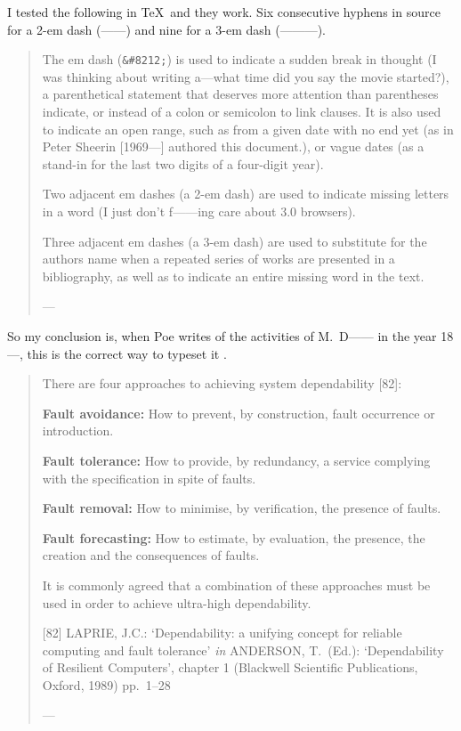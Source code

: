 \documentclass[a4paper]{article}
\begin{document}
\medskip
I tested the following in \TeX\ and they work.  Six consecutive hyphens
in source for a 2-em dash (------) and nine for a 3-em dash (---------).

\begin{quote}
	The em dash (\verb,&#8212;,) is used to indicate a sudden break
	in thought (I was thinking about writing a---what time did you
	say the movie started?), a parenthetical statement that deserves
	more attention than parentheses indicate, or instead of a colon
	or semicolon to link clauses.  It is also used to indicate an
	open range, such as from a given date with no end yet (as in Peter
	Sheerin [1969---] authored this document.), or vague dates (as
	a stand-in for the last two digits of a four-digit year).

	Two adjacent em dashes (a 2-em dash) are used to indicate missing
	letters in a word (I just don't f------ing care about 3.0 browsers).

	Three adjacent em dashes (a 3-em dash) are used to substitute for
	the authors name when a repeated series of works are presented in
	a bibliography, as well as to indicate an entire missing word in the text.

	---\citet{Sheerin2001}
\end{quote}

So my conclusion is, when Poe writes of the activities of M.~D------
in the year 18---, this is the correct way to typeset it \citep{Poe1844}.

\medskip
\begin{quote}
	There are four approaches to achieving system dependability [82]:

	\textbf{Fault avoidance:} How to prevent, by construction,
		fault occurrence or introduction.

	\textbf{Fault tolerance:} How to provide, by redundancy,
		a service complying with the specification in spite of faults.

	\textbf{Fault removal:} How to minimise, by verification,
		the presence of faults.

	\textbf{Fault forecasting:} How to estimate, by evaluation,
		the presence, the creation and the consequences of faults.

	It is commonly agreed that a combination of these approaches must
	be used in order to achieve ultra-high dependability.

	[82] LAPRIE, J.C.: `Dependability: a unifying concept for reliable
	computing and fault tolerance' {\it in} ANDERSON, T.\ (Ed.):
	`Dependability of Resilient Computers', chapter 1 (Blackwell
	Scientific Publications, Oxford, 1989) pp.~1--28

	---\citet[p.~4]{Bowen1993}
\end{quote}
\end{document}
